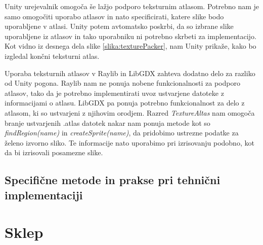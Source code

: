 \documentclass[12pt,a4paper,twoside]{book}
\begin{document}
Unity urejevalnik omogoča še lažjo podporo teksturnim atlasom. Potrebno nam je samo omogočiti uporabo atlasov in nato specificirati, katere slike bodo uporabljene v atlasi. Unity potem avtomatsko poskrbi, da so izbrane slike uporabljene iz atlasov in tako uporabniku ni potrebno skrbeti za implementacijo. Kot vidno iz desnega dela slike \ref{slika:texturePacker}, nam Unity prikaže, kako bo izgledal končni teksturni atlas.

Uporaba teksturnih atlasov v Raylib in LibGDX zahteva dodatno delo za razliko od Unity pogona. Raylib nam ne ponuja nobene funkcionalnosti za podporo atlasov, tako da je potrebno implementirati uvoz ustvarjene datoteke z informacijami o atlasu. LibGDX pa ponuja potrebno funkcionalnost za delo z atlasom, ki so ustvarjeni z njihovim orodjem. Razred \textit{TextureAltas} nam omogoča branje ustvarjenih .atlas datotek nakar nam ponuja metode kot so \textit{findRegion(name)} in \textit{createSprite(name)}, da pridobimo ustrezne podatke za želeno izvorno sliko. Te informacije nato uporabimo pri izrisovanju podobno, kot da bi izrisovali posamezne slike. 

\section{Specifične metode in prakse pri tehnični implementaciji}

\chapter{Sklep}\thispagestyle{fancy}

\cleardoublepage


\end{document}
